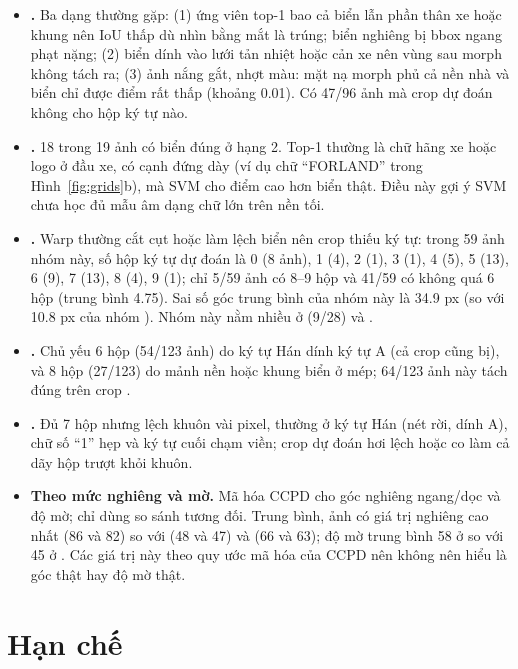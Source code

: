 \begin{itemize}
  \item \textbf{.} Ba dạng thường gặp: (1) ứng viên top-1 bao cả biển lẫn phần thân xe hoặc khung nên IoU thấp dù nhìn bằng mắt là trúng; biển nghiêng bị bbox ngang phạt nặng; (2) biển dính vào lưới tản nhiệt hoặc cản xe nên vùng sau morph không tách ra; (3) ảnh  nắng gắt, nhợt màu: mặt nạ morph phủ cả nền nhà và biển chỉ được điểm rất thấp (khoảng 0.01). Có 47/96 ảnh mà crop dự đoán không cho hộp ký tự nào.
  \item \textbf{.} 18 trong 19 ảnh có biển đúng ở hạng 2. Top-1 thường là chữ hãng xe hoặc logo ở đầu xe, có cạnh đứng dày (ví dụ chữ ``FORLAND'' trong Hình~\ref{fig:grids}b), mà SVM cho điểm cao hơn biển thật. Điều này gợi ý SVM chưa học đủ mẫu âm dạng chữ lớn trên nền tối.
  \item \textbf{.} Warp thường cắt cụt hoặc làm lệch biển nên crop thiếu ký tự: trong 59 ảnh nhóm này, số hộp ký tự dự đoán là 0 (8 ảnh), 1 (4), 2 (1), 3 (1), 4 (5), 5 (13), 6 (9), 7 (13), 8 (4), 9 (1); chỉ 5/59 ảnh có 8--9 hộp và 41/59 có không quá 6 hộp (trung bình 4.75). Sai số góc trung bình của nhóm này là 34.9 px (so với 10.8 px của nhóm ). Nhóm này nằm nhiều ở  (9/28) và .
  \item \textbf{.} Chủ yếu 6 hộp (54/123 ảnh) do ký tự Hán dính ký tự A (cả crop  cũng bị), và 8 hộp (27/123) do mảnh nền hoặc khung biển ở mép; 64/123 ảnh này tách đúng trên crop .
  \item \textbf{.} Đủ 7 hộp nhưng lệch khuôn vài pixel, thường ở ký tự Hán (nét rời, dính A), chữ số ``1'' hẹp và ký tự cuối chạm viền; crop dự đoán hơi lệch hoặc co làm cả dãy hộp trượt khỏi khuôn.
  \item {\sloppy \textbf{Theo mức nghiêng và mờ.} Mã hóa CCPD cho góc nghiêng ngang/dọc và độ mờ; chỉ dùng so sánh tương đối. Trung bình, ảnh  có giá trị nghiêng cao nhất (86 và 82) so với  (48 và 47) và  (66 và 63); độ mờ trung bình 58 ở  so với 45 ở . Các giá trị này theo quy ước mã hóa của CCPD nên không nên hiểu là góc thật hay độ mờ thật.\par}
\end{itemize}

\section{Hạn chế}
\label{sec:limits}

